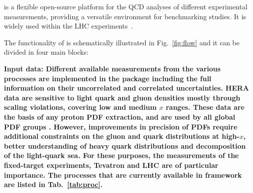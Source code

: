 %
\label{sec:structure}

\fitter is a flexible open-source platform for the QCD analyses of different experimental measurements, 
providing a versatile environment for benchmarking studies. It is widely used within the
LHC experiments~\cite{atlas:strange,atlas:jets,atlas:hm,cms:strange,h1:2012kk,h1zeus:charm}.  

The functionality of \fitter is schematically illustrated in Fig.~\ref{fig:flow} and it can be divided in four main blocks: %

\begin{description}
\item 
\bf {Input data:} \rm Different available measurements from the various processes
are implemented in the \fitter package including the full information on their uncorrelated 
and correlated uncertainties. HERA data 
are sensitive to light quark and gluon densities mostly through scaling violations, 
covering low and medium $x$ ranges. These data are the basis of any proton PDF extraction,
and are used by all global PDF groups \cite{MSTWpdf, CT10pdf, NNPDFpdf, ABMpdf, JRpdf}. 
However, improvements in precision of PDFs require additional constraints on the gluon and 
quark distributions at high-$x$, better understanding of heavy quark distributions and 
decomposition of the light-quark sea.  For these purposes, the measurements of the fixed-target 
experiments, Tevatron and LHC are of particular importance.
%
%
The processes that are currently available in \fitter framework are listed in Tab.~\ref{tab:proc}.

%
\begin{table}
\small
\scriptsize


\end{table}
\end{description}
